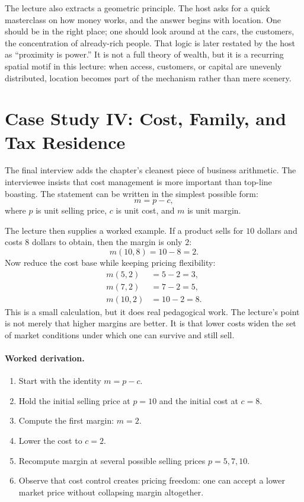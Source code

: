 The lecture also extracts a geometric principle. The host asks for a quick masterclass on how money works, and the answer begins with location. One should be in the right place; one should look around at the cars, the customers, the concentration of already-rich people. That logic is later restated by the host as ``proximity is power.'' It is not a full theory of wealth, but it is a recurring spatial motif in this lecture: when access, customers, or capital are unevenly distributed, location becomes part of the mechanism rather than mere scenery.

\section{Case Study IV: Cost, Family, and Tax Residence}

The final interview adds the chapter's cleanest piece of business arithmetic. The interviewee insists that cost management is more important than top-line boasting. The statement can be written in the simplest possible form:
\begin{equation}
m=p-c,
\end{equation}
where \(p\) is unit selling price, \(c\) is unit cost, and \(m\) is unit margin.

The lecture then supplies a worked example. If a product sells for \(10\) dollars and costs \(8\) dollars to obtain, then the margin is only \(2\):
\begin{equation}
m(10,8)=10-8=2.
\end{equation}
Now reduce the cost base while keeping pricing flexibility:
\begin{align}
m(5,2)&=5-2=3,\\
m(7,2)&=7-2=5,\\
m(10,2)&=10-2=8.
\end{align}
This is a small calculation, but it does real pedagogical work. The lecture's point is not merely that higher margins are better. It is that lower costs widen the set of market conditions under which one can survive and still sell.

\paragraph{Worked derivation.}
\begin{enumerate}
\item Start with the identity \(m=p-c\).
\item Hold the initial selling price at \(p=10\) and the initial cost at \(c=8\).
\item Compute the first margin: \(m=2\).
\item Lower the cost to \(c=2\).
\item Recompute margin at several possible selling prices \(p=5,7,10\).
\item Observe that cost control creates pricing freedom: one can accept a lower market price without collapsing margin altogether.
\end{enumerate}

